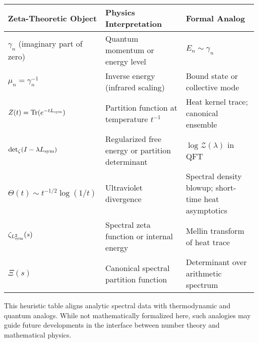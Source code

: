 \begin{center}
\small
\renewcommand{\arraystretch}{1.3}
\begin{tabularx}{\textwidth}{|>{\raggedright\arraybackslash}X
                        |>{\raggedright\arraybackslash}X
                        |>{\raggedright\arraybackslash}X|}
\hline
\textbf{Zeta-Theoretic Object} & \textbf{Physics Interpretation} & \textbf{Formal Analog} \\
\hline
\( \gamma_n \) (imaginary part of zero) &
Quantum momentum or energy level &
\( E_n \sim \gamma_n \) \\

\( \mu_n = \gamma_n^{-1} \) &
Inverse energy (infrared scaling) &
Bound state or collective mode \\

\( Z(t) = \operatorname{Tr}(e^{-t L_{\mathrm{sym}}}) \) &
Partition function at temperature \( t^{-1} \) &
Heat kernel trace; canonical ensemble \\

\( \det\nolimits_{\zeta}(I - \lambda L_{\mathrm{sym}}) \) &
Regularized free energy or partition determinant &
\( \log \mathcal{Z}(\lambda) \) in QFT \\

\( \Theta(t) \sim t^{-1/2} \log(1/t) \) &
Ultraviolet divergence &
Spectral density blowup; short-time heat asymptotics \\

\( \zeta_{L_{\mathrm{sym}}^2}(s) \) &
Spectral zeta function or internal energy &
Mellin transform of heat trace \\

\( \Xi(s) \) &
Canonical spectral partition function &
Determinant over arithmetic spectrum \\
\hline
\end{tabularx}
\end{center}

\medskip
\noindent
This heuristic table aligns analytic spectral data with thermodynamic and quantum analogs. While not mathematically formalized here, such analogies may guide future developments in the interface between number theory and mathematical physics.
